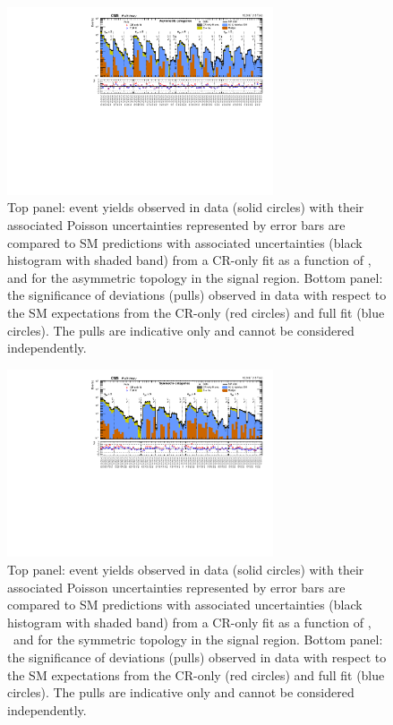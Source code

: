 \begin{figure}[!h]
  \begin{center}
    \includegraphics[angle=90,width=0.7\textwidth]{Figures/statisticalResults/summaryPlot_Asymmetric_prefit_overlay_fit_b}
    \caption{Top panel: event yields observed in data (solid circles) 
	with their associated Poisson uncertainties represented by error bars 
	are compared to SM predictions with associated uncertainties (black
      histogram with shaded band) from a CR-only fit as a function of
      \njet, \nb~ and \scalht for the asymmetric topology in the
      signal region. Bottom panel: the significance of deviations
      (pulls) observed in data with respect to the SM expectations
      from the CR-only (red circles) and full fit (blue circles). The
      pulls are indicative only and cannot be considered
      independently.}
    \label{fig:asym}
  \end{center}
\end{figure}

\begin{figure}[!h]
  \begin{center}
    \includegraphics[angle=90,width=0.7\textwidth]{Figures/statisticalResults/summaryPlot_Symmetric_prefit_overlay_fit_b}
    \caption{Top panel: event yields observed in data (solid circles) 
	with their associated Poisson uncertainties represented by error bars 
	are compared to SM predictions with associated uncertainties (black
      histogram with shaded band) from a CR-only fit as a function of
      \njet, \nb~and \scalht for the symmetric topology in the
      signal region. Bottom panel: the significance of deviations
      (pulls) observed in data with respect to the SM expectations
      from the CR-only (red circles) and full fit (blue circles). The
      pulls are indicative only and cannot be considered
      independently.}
    \label{fig:sym}
  \end{center}
\end{figure}

